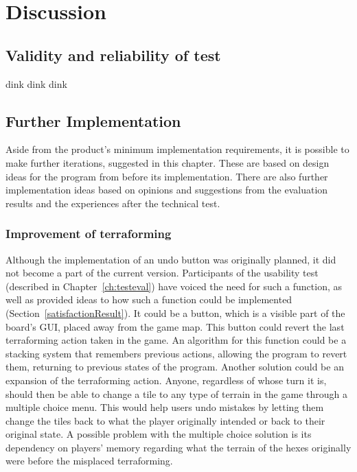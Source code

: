 \chapter{Discussion}\label{ch:discussion}

\section{Validity and reliability of test}
dink dink dink

\section{Further Implementation}
Aside from the product's minimum implementation requirements, it is possible to make further iterations, suggested in this chapter. These are based on design ideas for the program from before its implementation. There are also further implementation ideas based on opinions and suggestions from the evaluation results and the experiences after the technical test.

\subsection{Improvement of terraforming}
Although the implementation of an undo button was originally planned, it did not become a part of the current version. Participants of the usability test (described in Chapter~\ref{ch:testeval}) have voiced the need for such a function, as well as provided ideas to how such a function could be implemented (Section~\ref{satisfactionResult}). It could be a button, which is a visible part of the board's GUI, placed away from the game map. This button could revert the last terraforming action taken in the game. An algorithm for this function could be a stacking system that remembers previous actions, allowing the program to revert them, returning to previous states of the program. Another solution could be an expansion of the terraforming action. Anyone, regardless of whose turn it is, should then be able to change a tile to any type of terrain in the game through a multiple choice menu. This would help users undo mistakes by letting them change the tiles back to what the player originally intended or back to their original state. A possible problem with the multiple choice solution is its dependency on players' memory regarding what the terrain of the hexes originally were before the misplaced terraforming. 

